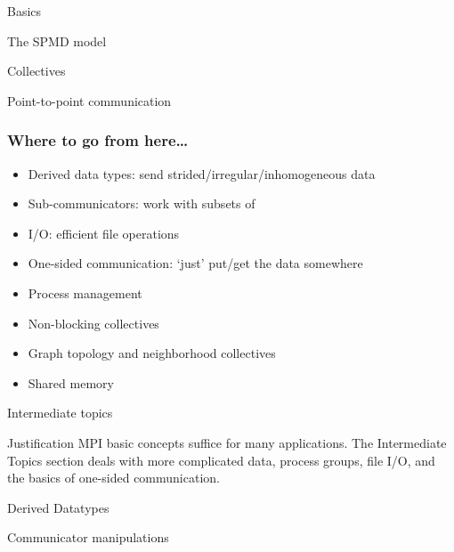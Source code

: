 \documentclass[10pt]{beamer}
\begin{document}
\frame{\tableofcontents}
{} {Basics}

\renewcommand\standardversion{3}

{} {The SPMD model}
\label{sec:spmd}


{} {Collectives}
\label{sec:collectives}


{} {Point-to-point communication}
\label{sec:ptp}


\iffalse
\begin{exerciseframe}[serialsend]
  
\end{exerciseframe}
\fi

\begin{frame}[containsverbatim]\frametitle{Where to go from here\ldots}
  \begin{itemize}
  \item Derived data types: send strided/irregular/inhomogeneous data
  \item Sub-communicators: work with subsets of 
  \item I/O: efficient file operations
  \item One-sided communication: `just' put/get the data somewhere
  \item Process management
  \item Non-blocking collectives
  \item Graph topology and neighborhood collectives
  \item Shared memory
  \end{itemize}
\end{frame}

\renewcommand\standardversion{}

{} {Intermediate topics}

\begin{frame}{Justification}
  MPI basic concepts suffice for many applications.  The Intermediate
  Topics section deals with more complicated data, process groups,
  file I/O, and the basics of one-sided communication.
\end{frame}

{} {Derived Datatypes}
\label{sec:derived}


{} {Communicator manipulations}
\label{sec:comm}

\end{document}
